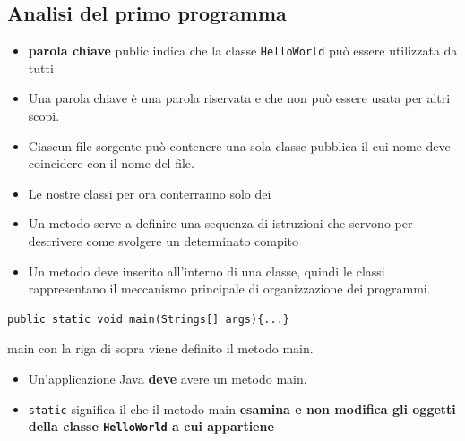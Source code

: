 \subsection*{Analisi del primo programma}
\begin{frame}
\begin{block}{}
\begin{itemize}
\item \textbf{parola chiave} \alert{public} indica che la classe \texttt{HelloWorld} può essere utilizzata da tutti
\item Una parola chiave è una parola riservata e che non può essere usata per altri scopi.
\item Ciascun file sorgente può contenere una sola classe pubblica il cui nome deve coincidere con il nome del file.
\end{itemize}
\end{block}

\begin{block}{}
\begin{itemize}
\item Le nostre classi per ora conterranno solo dei 
\item Un metodo serve a definire una sequenza di istruzioni che servono per descrivere come svolgere un determinato
compito
\item Un metodo \alert{deve} inserito all'interno di una classe, quindi le classi rappresentano il meccanismo principale di organizzazione dei programmi.
\end{itemize}
\end{block}
\end{frame}

\begin{frame}[fragile]
\begin{lstlisting}
public static void main(Strings[] args){...}
\end{lstlisting}
\begin{block}{main}
con la riga di sopra viene definito il metodo \alert{main}.
\begin{itemize}
\item Un'applicazione Java \textbf{deve} avere un metodo \alert{main}.
\item \texttt{static} significa il che il metodo \alert{main} \textbf{esamina e non modifica gli oggetti 
della classe \texttt{HelloWorld} a cui appartiene}
\end{itemize}
\end{block}
\end{frame}

